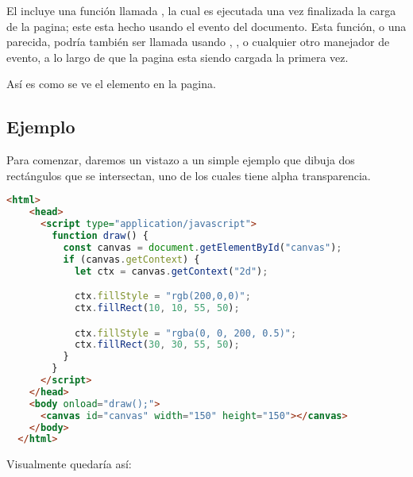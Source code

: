 El  incluye una función llamada , la cual es ejecutada una vez finalizada la carga de la pagina; este esta hecho usando el evento  del documento. Esta función, o una parecida, podría también ser llamada usando  ,  , o cualquier otro manejador de evento, a lo largo de que la pagina esta siendo cargada la primera vez.

Así es como se ve el elemento  en la pagina.

\vspace{0.5cm} %
\begin{center}
\end{center}
\vspace{0.5cm} %

\newpage %
\subsection{Ejemplo}

Para comenzar, daremos un vistazo a un simple ejemplo que dibuja dos rectángulos que se intersectan, uno de los cuales tiene alpha transparencia.

\vspace{0.5cm} %
\begin{lstlisting}[language=HTML, style=mystyle2]
  <html>
    <head>
      <script type="application/javascript">
        function draw() {
          const canvas = document.getElementById("canvas");
          if (canvas.getContext) {
            let ctx = canvas.getContext("2d");

            ctx.fillStyle = "rgb(200,0,0)";
            ctx.fillRect(10, 10, 55, 50);

            ctx.fillStyle = "rgba(0, 0, 200, 0.5)";
            ctx.fillRect(30, 30, 55, 50);
          }
        }
      </script>
    </head>
    <body onload="draw();">
      <canvas id="canvas" width="150" height="150"></canvas>
    </body>
  </html>
\end{lstlisting}
\vspace{0.5cm} %

Visualmente quedaría así:

\vspace{0.5cm} %
\begin{center}
\end{center}
